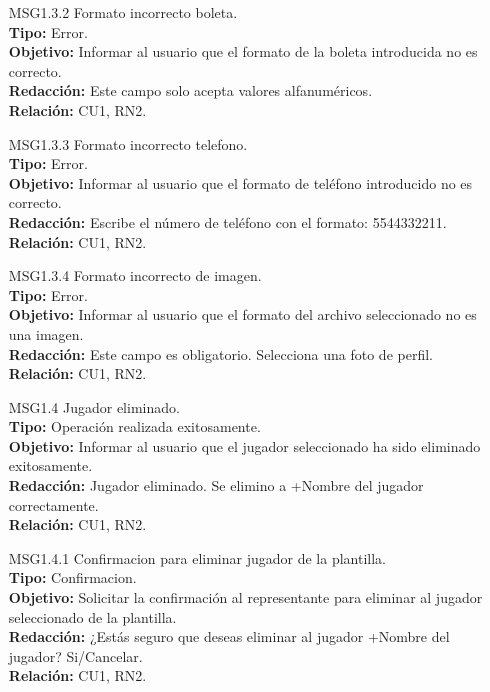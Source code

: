 \begin{itemize}
	 \item[MSG1.3.2] Formato incorrecto boleta.\\
	 \textbf{Tipo:} Error.\\
	 \textbf{Objetivo:} Informar al usuario que el formato de la boleta introducida no es correcto.\\
	 \textbf{Redacción:} Este campo solo acepta valores alfanuméricos. \\
	 \textbf{Relación:} CU1, RN2.
	 
	 \item[MSG1.3.3] Formato incorrecto telefono.\\
	 \textbf{Tipo:} Error.\\
	 \textbf{Objetivo:} Informar al usuario que el formato de teléfono introducido no es correcto.\\
	 \textbf{Redacción:} Escribe el número de teléfono con el formato: 5544332211. \\
	 \textbf{Relación:} CU1, RN2.
	 
	 \item[MSG1.3.4] Formato incorrecto de imagen.\\
	 \textbf{Tipo:} Error.\\
	 \textbf{Objetivo:} Informar al usuario que el formato del archivo seleccionado no es una imagen.\\
	 \textbf{Redacción:} Este campo es obligatorio. Selecciona una foto de perfil. \\
	 \textbf{Relación:} CU1, RN2.
	 
	 \item[MSG1.4] Jugador eliminado.\\
	 \textbf{Tipo:} Operación realizada exitosamente.\\
	 \textbf{Objetivo:} Informar al usuario que el jugador seleccionado ha sido eliminado exitosamente.\\
	 \textbf{Redacción:} Jugador eliminado. Se elimino a +Nombre del jugador correctamente. \\
	 \textbf{Relación:} CU1, RN2.
	 
	 \item[MSG1.4.1] Confirmacion para eliminar jugador de la plantilla.\\
	 \textbf{Tipo:} Confirmacion.\\
	 \textbf{Objetivo:} Solicitar la confirmación al representante para eliminar al jugador seleccionado de la plantilla.\\
	 \textbf{Redacción:} ¿Estás seguro que deseas eliminar al jugador +Nombre del jugador? Si/Cancelar. \\
	 \textbf{Relación:} CU1, RN2.
	 

\end{itemize}
